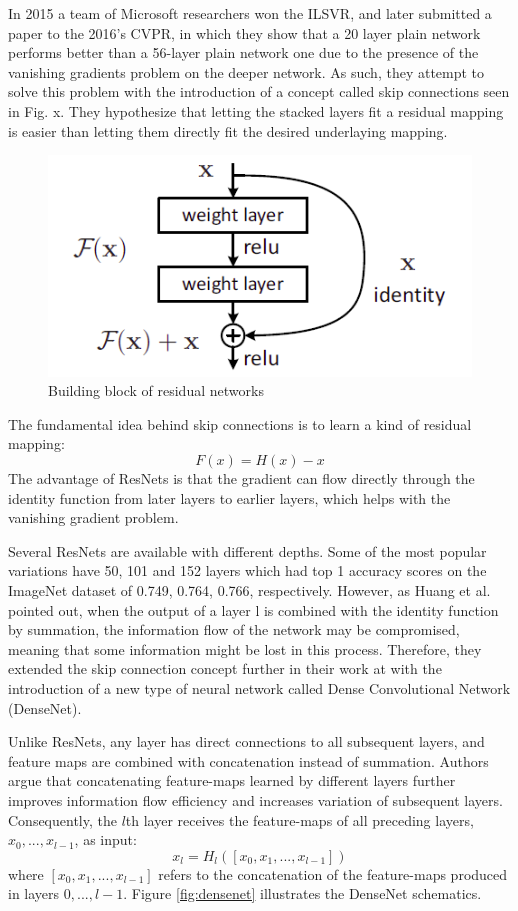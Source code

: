 In 2015 a team of Microsoft researchers won the ILSVR, and later submitted a paper to the 2016's CVPR, in which they show that a 20 layer plain network performs better than a 56-layer plain network one due to the presence of the vanishing gradients problem on the deeper network. As such, they attempt to solve this problem with the introduction of a concept called skip connections seen in Fig. x. They hypothesize that letting the stacked layers fit a residual mapping is easier than letting them directly fit the desired underlaying mapping. \par
\begin{figure}[ht]
  \centering
    \includegraphics[width=0.5\linewidth]{figs/skip_connection.png}
  \caption{Building block of residual networks \cite{resnet}}
\end{figure}
\par
The fundamental idea behind skip connections is to learn a kind of residual mapping: 
\begin{equation}
    F(x)=H(x)-x
\end{equation}
The advantage of ResNets is that the gradient can flow directly through the identity function from later layers to earlier layers, which helps with the vanishing gradient problem. \par
Several ResNets are available with different depths. Some of the most popular variations have 50, 101 and 152 layers which had top 1 accuracy scores on the ImageNet dataset of 0.749, 0.764, 0.766, respectively. 
However, as Huang et al. pointed out, when the output of a layer l is combined with the identity function by summation, the information flow of the network may be compromised, meaning that some information might be lost in this process. Therefore, they extended the skip connection concept further in their work at \cite{densenet} with the introduction of a new type of neural network called Dense Convolutional Network (DenseNet). \par
Unlike ResNets, any layer has direct connections to all subsequent layers, and feature maps are combined with concatenation instead of summation. Authors argue that concatenating feature-maps learned by different layers further improves information flow efficiency and increases variation of subsequent layers. Consequently, the $l$th layer receives the feature-maps of all preceding layers, $ x_0, . . . , x_{l-1} $, as input:
\begin{equation}
    x_l = H_l([x_0, x_1, . . . , x_{l-1}])
\end{equation}
where $ [x_0, x_1, . . . , x_{l-1}] $ refers to the concatenation of the feature-maps produced in layers $ 0, . . . , l-1 $. Figure \ref{fig:densenet} illustrates the DenseNet schematics.

